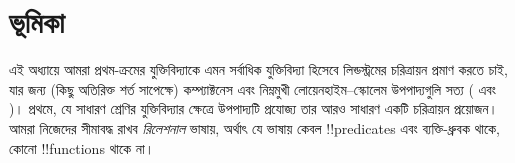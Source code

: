 \documentclass[../../../include/open-logic-section]{subfiles}
\begin{document}
\section{ভূমিকা}

এই অধ্যায়ে আমরা প্রথম-ক্রমের যুক্তিবিদ্যাকে এমন সর্বাধিক যুক্তিবিদ্যা
হিসেবে লিন্ডস্ট্রমের চরিত্রায়ন প্রমাণ করতে চাই, যার জন্য (কিছু অতিরিক্ত
শর্ত সাপেক্ষে) কম্প্যাক্টনেস এবং নিম্নমুখী
লোয়েনহাইম--স্কোলেম উপপাদ্যগুলি সত্য
( এবং
)। প্রথমে, যে সাধারণ শ্রেণির
যুক্তিবিদ্যার ক্ষেত্রে উপপাদ্যটি প্রযোজ্য তার আরও সাধারণ একটি চরিত্রায়ন
প্রয়োজন। আমরা নিজেদের সীমাবদ্ধ রাখব \emph{রিলেশনাল} ভাষায়, অর্থাৎ
যে ভাষায় কেবল !!{predicate}s এবং ব্যক্তি-ধ্রুবক থাকে, কোনো !!{function}s
থাকে না।
\end{document}
